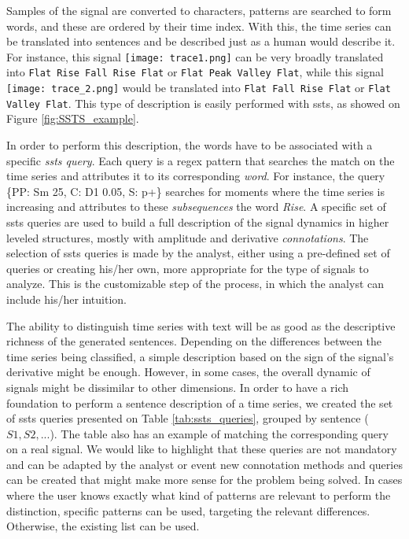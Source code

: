 Samples of the signal are converted to characters, patterns are searched to form words, and these are ordered by their time index. With this, the time series can be translated into sentences and be described just as a human would describe it. For instance, this signal \texttt{[image: trace1.png]} can be very broadly translated into \texttt{Flat Rise Fall Rise Flat} or \texttt{Flat Peak Valley Flat}, while this signal \texttt{[image: trace\_2.png]} would be translated into \texttt{Flat Fall Rise Flat} or \texttt{Flat Valley Flat}. This type of description is easily performed with \gls{ssts}, as showed on Figure \ref{fig:SSTS_example}.
\par
In order to perform this description, the words have to be associated with a specific \textit{\gls{ssts} query}. Each query is a \gls{regex} pattern that searches the match on the time series and attributes it to its corresponding \textit{word}. For instance, the query \{PP: Sm 25, C: D1 0.05, S: p+\} searches for moments where the time series is increasing and attributes to these \textit{subsequences} the word \textit{Rise}. A specific set of \gls{ssts} queries are used to build a full description of the signal dynamics in higher leveled structures, mostly with amplitude and derivative \textit{connotations}. 
The selection of \gls{ssts} queries is made by the analyst, either using a pre-defined set of queries or creating his/her own, more appropriate for the type of signals to analyze. This is the customizable step of the process, in which the analyst can include his/her intuition.
\par
The ability to distinguish time series with text will be as good as the descriptive richness of the generated sentences. Depending on the differences between the time series being classified, a simple description based on the sign of the signal's derivative might be enough. However, in some cases, the overall dynamic of signals might be dissimilar to other dimensions. In order to have a rich foundation to perform a sentence description of a time series, we created the set of \gls{ssts} queries presented on Table \ref{tab:ssts_queries}, grouped by sentence ($S1, S2, ...$). 
The table also has an example of matching the corresponding query on a real signal. We would like to highlight that these queries are not mandatory and can be adapted by the analyst or event new connotation methods and queries can be created that might make more sense for the problem being solved. In cases where the user knows exactly what kind of patterns are relevant to perform the distinction, specific patterns can be used, targeting the relevant differences. Otherwise, the existing list can be used.

